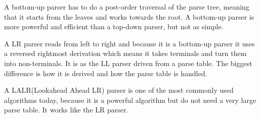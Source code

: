 A bottom-up parser has to do a post-order traversal of the parse tree, meaning that it starts from the leaves and works towards the root.
A bottom-up parser is more powerful and efficient than a top-down parser, but not as simple.

A LR parser reads from left to right and because it is a bottom-up parser it uses a reversed rightmost derivation which means it takes terminals and turn them into non-terminals. It is as the LL parser driven from a parse table. The biggest difference is how it is derived and how the parse table is handled.  

A LALR(Lookahead Ahead LR) parser is one of the most commonly used algorithms today, because it is a powerful algorithm but do not need a very large parse table. It works like the LR parser.

